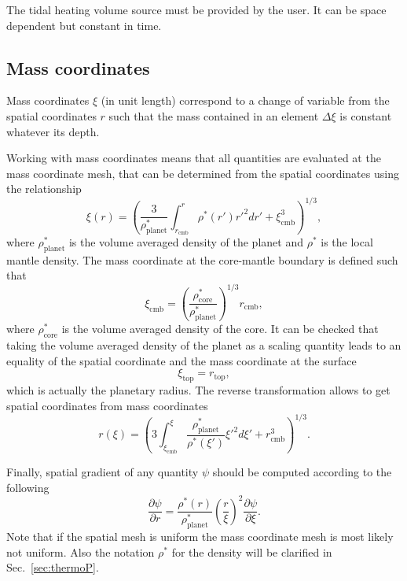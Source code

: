 \documentclass{article}
\begin{document}
The tidal heating volume source must be provided by the user. It can be space dependent but constant in time.

\subsection{Mass coordinates}
\label{sec:mass_coord}

Mass coordinates $\xi$ (in unit length) correspond to a change of variable from the spatial coordinates $r$ such that the mass contained in an element $\Delta \xi$ is constant whatever its depth.

Working with mass coordinates means that all quantities are evaluated at the mass coordinate mesh, that can be determined from the spatial coordinates using the relationship
\begin{equation}
\xi(r) = \left( \frac{3}{\rho^*_\mathrm{planet}}\int^r_{r_\mathrm{cmb}} \rho^*(r') r'^2dr' +\xi_\mathrm{cmb}^3 \right)^{1/3},
\end{equation}
where $\rho^*_\mathrm{planet}$ is the volume averaged density of the planet and $\rho^*$ is the local mantle density. The mass coordinate at the core-mantle boundary is defined such that
\begin{equation}
\xi_\mathrm{cmb} = \left(\frac{\rho^*_\mathrm{core}}{\rho^*_\mathrm{planet}}\right)^{1/3} r_\mathrm{cmb},
\end{equation}
where $\rho^*_\mathrm{core}$ is the volume averaged density of the core. It can be checked that taking the volume averaged density of the planet as a scaling quantity leads to an equality of the spatial coordinate and the mass coordinate at the surface
\begin{equation}
\xi_\mathrm{top} = r_\mathrm{top},
\end{equation}
which is actually the planetary radius. The reverse transformation allows to get spatial coordinates from mass coordinates
\begin{equation}
   r(\xi) = \left( 3\int^\xi_{\xi_\mathrm{cmb}} \frac{\rho^*_\mathrm{planet}}{\rho^*(\xi')} \xi'^2d\xi' +r_\mathrm{cmb}^3 \right)^{1/3}.
\end{equation}

Finally, spatial gradient of any quantity $\psi$ should be computed according to the following
\begin{equation}
    \frac{\partial \psi}{\partial r} = \frac{\rho^*(r)}{\rho^*_\mathrm{planet}} \left(\frac{r}{\xi}\right)^2 \frac{\partial \psi}{\partial \xi}.
\end{equation}
Note that if the spatial mesh is uniform the mass coordinate mesh is most likely not uniform. Also the notation $\rho^*$ for the density will be clarified in Sec.~\ref{sec:thermoP}.
\end{document}
